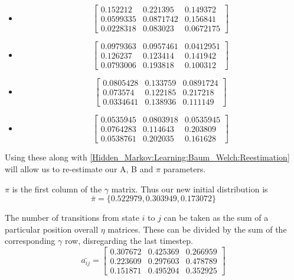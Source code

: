 \begin{example}
        \begin{itemize}
            \item \[
                \begin{bmatrix}
                    0.152212  & 0.221395  & 0.149372  \\
                    0.0599335 & 0.0871742 &  0.156841 \\ 
                    0.0228318 & 0.083023  & 0.0672175 
                \end{bmatrix}
            \]
            \item \[
                \begin{bmatrix}
                    0.0979363 & 0.0957461 &  0.0412951 \\
                    0.126237  & 0.123414  & 0.141942 \\
                    0.0793006 & 0.193818  & 0.100312 
                \end{bmatrix}
            \]           
            \item \[
                \begin{bmatrix}
                    0.0805428 &  0.133759 &  0.0891724 \\
                    0.073574  & 0.122185  & 0.217218 \\
                    0.0334641 &  0.138936 &  0.111149                      
                \end{bmatrix}
            \]
            \item \[
                \begin{bmatrix}
                    0.0535945 & 0.0803918 &  0.0535945 \\
                    0.0764283 & 0.114643  & 0.203809 \\
                    0.0538761 & 0.202035  & 0.161628 
                \end{bmatrix}
            \]
        \end{itemize}

        Using these along with \ref{Hidden_Markov:Learning:Baum_Welch:Reestimation} will allow us to re-estimate our A, B and $\pi$ parameters.

        $\pi$ is the first column of the $\gamma$ matrix. Thus our new initial distribution is 
        \begin{equation}
            \bar{\pi} = \{0.522979, 0.303949,   0.173072\}
        \end{equation}
        
        The number of transitions from state $i$ to $j$ can be taken as the sum of a particular position overall $\eta$ matrices. These can be divided by the sum of the corresponding $\gamma$ row, disregarding the last timestep.
        \begin{equation}
            \bar{a_{ij}} = \begin{bmatrix}
                0.307672  & 0.425369  & 0.266959 \\
                0.223609  & 0.297603  & 0.478789 \\
                0.151871  & 0.495204  & 0.352925
            \end{bmatrix}
        \end{equation}


\end{example}
